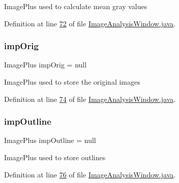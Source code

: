 Image\+Plus used to calculate mean gray values 

Definition at line \hyperlink{_image_analysis_window_8java_source_l00072}{72} of file \hyperlink{_image_analysis_window_8java_source}{Image\+Analysis\+Window.\+java}.

\hypertarget{classgui_1_1_image_analysis_window_a69562d3583c362d2b643c170f0eae39f}{}\label{classgui_1_1_image_analysis_window_a69562d3583c362d2b643c170f0eae39f} 
\subsubsection{\texorpdfstring{imp\+Orig}{impOrig}}
{\footnotesize\ttfamily Image\+Plus imp\+Orig = null\hspace{0.3cm}{\ttfamily [protected]}}

Image\+Plus used to store the original images 

Definition at line \hyperlink{_image_analysis_window_8java_source_l00074}{74} of file \hyperlink{_image_analysis_window_8java_source}{Image\+Analysis\+Window.\+java}.

\hypertarget{classgui_1_1_image_analysis_window_af6d74fd318c36f34d66ca8a63271995e}{}\label{classgui_1_1_image_analysis_window_af6d74fd318c36f34d66ca8a63271995e} 
\subsubsection{\texorpdfstring{imp\+Outline}{impOutline}}
{\footnotesize\ttfamily Image\+Plus imp\+Outline = null\hspace{0.3cm}{\ttfamily [protected]}}

Image\+Plus used to store outlines 

Definition at line \hyperlink{_image_analysis_window_8java_source_l00076}{76} of file \hyperlink{_image_analysis_window_8java_source}{Image\+Analysis\+Window.\+java}.

\hypertarget{classgui_1_1_image_analysis_window_a98940a0ff5c7eef6f6347a8c9c98c645}{}\label{classgui_1_1_image_analysis_window_a98940a0ff5c7eef6f6347a8c9c98c645} 
